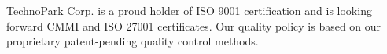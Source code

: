 
TechnoPark Corp. is a proud holder of ISO 9001 certification and
is looking forward CMMI and ISO 27001 certificates. Our quality policy
is based on our proprietary patent-pending quality control methods.
